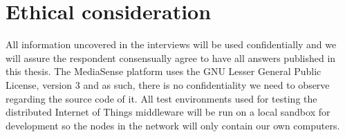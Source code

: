 \section{Ethical consideration}
All information uncovered in the interviews will be used confidentially and we will assure the respondent consensually agree to have all answers published in this thesis.
The MediaSense platform uses the GNU Lesser General Public License, version 3 \cite{gnu} and as such, there is no confidentiality we need to observe regarding the source code of it.
All test environments used for testing the distributed Internet of Things middleware will be run on a local sandbox for development so the nodes in the network will only contain our own computers. 
